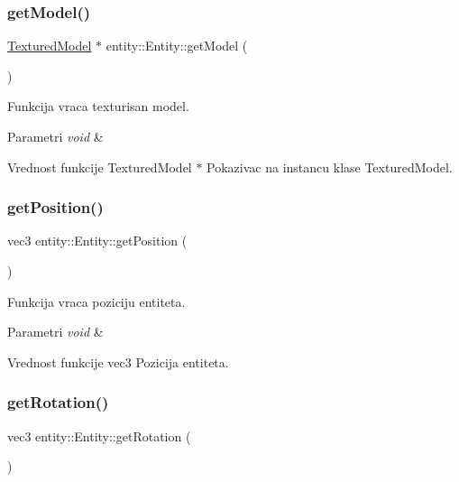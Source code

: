 \subsubsection{\texorpdfstring{get\+Model()}{getModel()}}
{\footnotesize\ttfamily \hyperlink{classmodel_1_1TexturedModel}{Textured\+Model} $\ast$ entity\+::\+Entity\+::get\+Model (\begin{DoxyParamCaption}{ }\end{DoxyParamCaption})}



Funkcija vraca texturisan model. 


\begin{DoxyParams}{Parametri}
{\em void} & \\
\hline
\end{DoxyParams}
\begin{DoxyReturn}{Vrednost funkcije}
Textured\+Model $\ast$ Pokazivac na instancu klase Textured\+Model. 
\end{DoxyReturn}
\mbox{\label{classentity_1_1Entity_ad255abb1afcceceb6f2efea66086d8bd}} 
\subsubsection{\texorpdfstring{get\+Position()}{getPosition()}}
{\footnotesize\ttfamily vec3 entity\+::\+Entity\+::get\+Position (\begin{DoxyParamCaption}{ }\end{DoxyParamCaption})}



Funkcija vraca poziciju entiteta. 


\begin{DoxyParams}{Parametri}
{\em void} & \\
\hline
\end{DoxyParams}
\begin{DoxyReturn}{Vrednost funkcije}
vec3 Pozicija entiteta. 
\end{DoxyReturn}
\mbox{\label{classentity_1_1Entity_a58680b88c9179d9cab22e881b320f9f7}} 
\subsubsection{\texorpdfstring{get\+Rotation()}{getRotation()}}
{\footnotesize\ttfamily vec3 entity\+::\+Entity\+::get\+Rotation (\begin{DoxyParamCaption}{ }\end{DoxyParamCaption})}



